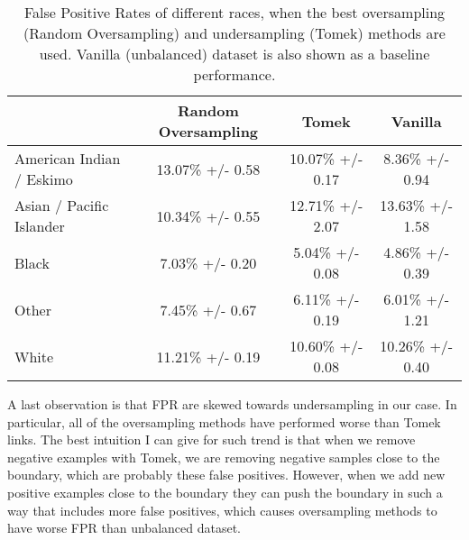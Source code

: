 \documentclass{article}
\begin{document}
\begin{table}[h]
	\centering
	\begin{tabular}{|l|c|c|c|}
		\hline
		& Random Oversampling & Tomek & Vanilla \\
		\hline
		American Indian / Eskimo &  13.07\% +/- 0.58 &  10.07\% +/- 0.17&  8.36\% +/- 0.94\\
		\hline
		Asian / Pacific Islander & 10.34\% +/- 0.55 & 12.71\% +/- 2.07& 13.63\% +/- 1.58\\
		\hline
		Black & 7.03\% +/- 0.20 & 5.04\% +/- 0.08& 4.86\% +/- 0.39\\
		\hline
		Other & 7.45\% +/- 0.67 & 6.11\% +/- 0.19& 6.01\% +/- 1.21\\
		\hline
		White & 11.21\% +/- 0.19 & 10.60\% +/- 0.08& 10.26\% +/- 0.40\\
		\hline
	\end{tabular}
	\caption{False Positive Rates of different races, when the best oversampling (Random Oversampling) and undersampling (Tomek) methods are used. Vanilla (unbalanced) dataset is also shown as a baseline performance.}
	\label{tab:race}
\end{table}

A last observation is that FPR are skewed towards undersampling in our case. In particular, all of the oversampling methods have performed worse than Tomek links. The best intuition I can give for such trend is that when we remove negative examples with Tomek, we are removing negative samples close to the boundary, which are probably these false positives. However, when we add new positive examples close to the boundary they can push the boundary in such a way that includes more false positives, which causes oversampling methods to have worse FPR than unbalanced dataset.



\end{document}
